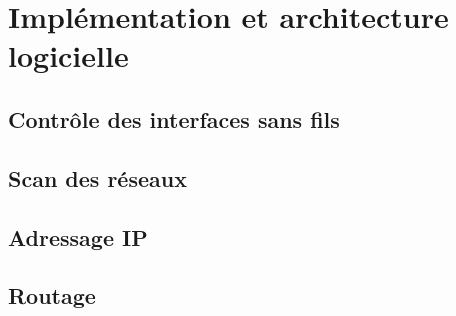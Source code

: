 \chapter{Implémentation et architecture logicielle}
\section{Contrôle des interfaces sans fils}
\section{Scan des réseaux}
\section{Adressage IP}
\section{Routage}